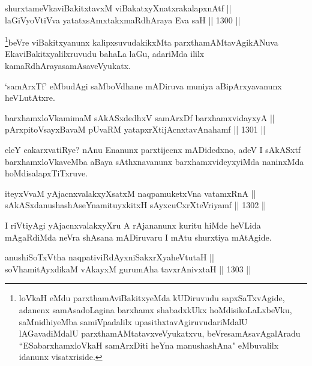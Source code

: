 \begin{shl}
shurxtameVkaviBakitxtavxM viBakatxyXnatxrakalapxnAtf || \\
laGiVyoV\s tiVva yatatxsAmxtakxmaRdhAraya Eva saH \hfill || 1300 ||  
\end{shl}

\begin{artha}
\footnote{loVkaH eMdu parxthamAviBakitxyeMda kUDiruvudu sapxSaTxvAgide, adanenx samAsadoLagina barxhamx shabadxkUkx hoMdisikoLaLxbeVku, saMnidhiyeMba samiVpadalilx upasithxtavAgiruvudariMdalU lAGavadiMdalU parxthamAMtatavxveVyukatxvu, beVresamAsavAgalAradu ``ESabarxhamxloVkaH samArxDiti heYna manushashAna" eMbuvalilx idanunx visatxriside.}beVre viBakitxyanunx kalipxsuvudakikxMta parxthamAMtavAgikANuva EkaviBakitxyalilxruvudu bahaLa laGu, adariMda ililx kamaRdhArayasamAsaveVyukatx.
\end{artha}

\begin{artha}
`samArxTf' eMbudAgi saMboVdhane mADiruva muniya aBipArxyavanunx heVLutAtxre.
\end{artha}

\begin{shl}
barxhamxloVkamimaM sAkASxdedhxV samArxDf barxhamxvidayxyA || \\
pArxpitoV\s sayxBavaM pUvaRM yatapxrXtijAcnxtavAnahamf \hfill || 1301 ||  
\end{shl}

\begin{artha}
eleY cakarxvatiRye? nAnu Enanunx parxtijecnx mADidedxno, adeV I sAkASxtf barxhamxloVkaveMba aBaya sAthxnavanunx barxhamxvideyxyiMda naninxMda hoMdisalapxTiTxruve.
\end{artha}


\begin{shl}
iteyxVvaM yAjacnxvalakxyXsatxM naqpamuketxVna vatamxRnA || \\
sAkASxdanushashAseYnamituyxkitxH sAyxcuCxrXteVriyamf \hfill || 1302 ||  
\end{shl}

\begin{artha}
I riVtiyAgi yAjacnxvalakxyXru A rAjananunx kuritu hiMde heVLida mAgaRdiMda neVra shAsana mADiruvaru I mAtu shurxtiya mAtAgide.
\end{artha}


\begin{shl}
anushiSoTxV\s tha naqpativiRdAyxniSakxrXyaheVtutaH || \\
soV\s hamitAyxdikaM vAkayxM gurumAha tavxrAnivxtaH \hfill || 1303 ||  
\end{shl}

